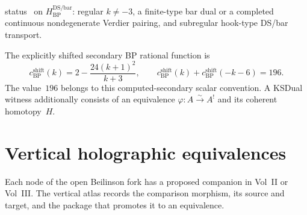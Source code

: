 \begin{remark}
\begin{itemize}
status \ClaimStatusConditional\ on
$H_{\mathrm{BP}}^{\mathrm{DS/bar}}$: regular $k\ne-3$, a finite-type
bar dual or a completed continuous nondegenerate Verdier pairing, and
subregular hook-type DS/bar transport.
\end{itemize}
The explicitly shifted secondary BP rational function is
\[
 c_{\mathrm{BP}}^{\mathrm{shift}}(k)
 =2-\frac{24(k+1)^2}{k+3},
 \qquad
 c_{\mathrm{BP}}^{\mathrm{shift}}(k)
 +c_{\mathrm{BP}}^{\mathrm{shift}}(-k-6)=196.
\]
The value~$196$ belongs to this computed-secondary scalar convention.
A KSDual witness additionally consists of an equivalence
$\varphi\colon A\xrightarrow{\sim}A^!$ and its coherent homotopy~$H$.
\end{remark}

\section{Vertical holographic equivalences}
\label{sec:mr-vertical}

Each node of the open Beilinson fork has a proposed companion in
Vol~II or Vol~III.  The vertical atlas records the comparison morphism,
its source and target, and the package that promotes it to an
equivalence.

